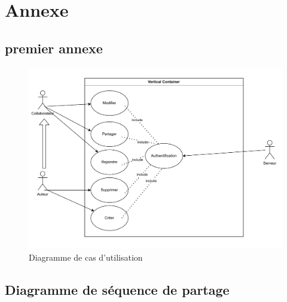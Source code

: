 	
	\section{Annexe}
	\appendix
	\newpage
	
	\subsection{premier annexe}
\par

	\begin{figure}[hb]
		\centering

		\includegraphics[scale=.3]{setup/diagramme_de_cas.png}
	\caption{Diagramme de cas d'utilisation}	
	\end{figure}
	\newpage
	
	\subsection{Diagramme de séquence de partage}
	
